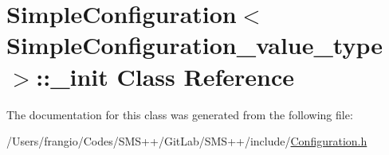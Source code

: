 \hypertarget{class_s_m_spp__di__unipi__it_1_1_simple_configuration_1_1__init}{}\section{Simple\+Configuration$<$ Simple\+Configuration\+\_\+value\+\_\+type $>$\+:\+:\+\_\+init Class Reference}
\label{class_s_m_spp__di__unipi__it_1_1_simple_configuration_1_1__init}


The documentation for this class was generated from the following file\+:\begin{DoxyCompactItemize}
\item 
/\+Users/frangio/\+Codes/\+S\+M\+S++/\+Git\+Lab/\+S\+M\+S++/include/\mbox{\hyperlink{_configuration_8h}{Configuration.\+h}}\end{DoxyCompactItemize}
